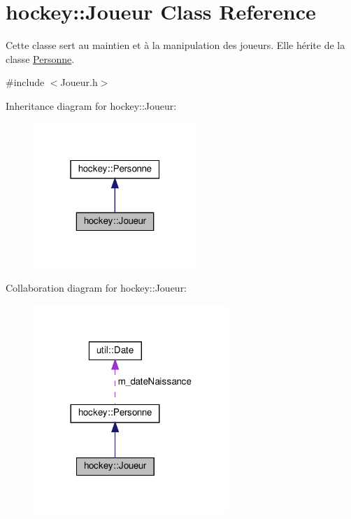 \hypertarget{classhockey_1_1Joueur}{}\section{hockey\+:\+:Joueur Class Reference}
\label{classhockey_1_1Joueur}


Cette classe sert au maintien et à la manipulation des joueurs. Elle hérite de la classe \hyperlink{classhockey_1_1Personne}{Personne}.  




{\ttfamily \#include $<$Joueur.\+h$>$}



Inheritance diagram for hockey\+:\+:Joueur\+:\nopagebreak
\begin{figure}[H]
\begin{center}
\leavevmode
\includegraphics[width=175pt]{classhockey_1_1Joueur__inherit__graph}
\end{center}
\end{figure}


Collaboration diagram for hockey\+:\+:Joueur\+:\nopagebreak
\begin{figure}[H]
\begin{center}
\leavevmode
\includegraphics[width=209pt]{classhockey_1_1Joueur__coll__graph}
\end{center}
\end{figure}
